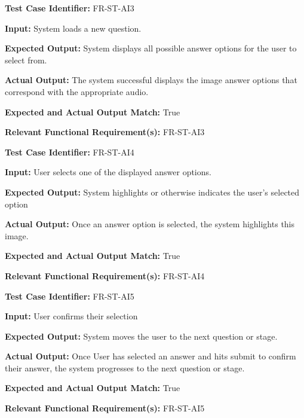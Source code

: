 \documentclass[12pt, titlepage]{article}
\begin{document}
\begin{mdframed}[linewidth=0.5mm] \par
  \textbf{Test Case Identifier:} FR-ST-AI3 \par
  \textbf{Input:} System loads a new question.
  \par
  \textbf{Expected Output:} System displays all possible answer options for the user to select from.
  \par
  \textbf{Actual Output:} The system successful displays the image answer options that correspond with the appropriate audio. \par 
  \textbf{Expected and Actual Output Match:} True \par
  \textbf{Relevant Functional Requirement(s):} FR-ST-AI3
\end{mdframed}

\begin{mdframed}[linewidth=0.5mm] \par
  \textbf{Test Case Identifier:} FR-ST-AI4 \par
  \textbf{Input:} User selects one of the displayed answer options.
  \par
  \textbf{Expected Output:} System highlights or otherwise indicates the user’s selected option \par
  \textbf{Actual Output:} Once an answer option is selected, the system highlights this image. \par 
  \textbf{Expected and Actual Output Match:} True \par
  \textbf{Relevant Functional Requirement(s):} FR-ST-AI4
\end{mdframed}

\begin{mdframed}[linewidth=0.5mm] \par
  \textbf{Test Case Identifier:} FR-ST-AI5 \par
  \textbf{Input:} User confirms their selection
  \par
  \textbf{Expected Output:}  System moves the user to the next question or stage. \par
  \textbf{Actual Output:} Once User has selected an answer and hits submit to confirm their answer, 
  the system progresses to the next question or stage. \par
  \textbf{Expected and Actual Output Match:} True \par
  \textbf{Relevant Functional Requirement(s):} FR-ST-AI5
\end{mdframed}
\end{document}
